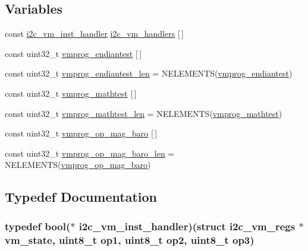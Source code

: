 \subsection*{\-Variables}
\begin{DoxyCompactItemize}
\item 
const \hyperlink{group___generic_i2_c_sensor_gadf40759a617bda9fd99790f2c1f2699a}{i2c\-\_\-vm\-\_\-inst\-\_\-handler} \hyperlink{group___generic_i2_c_sensor_gab83cd2149bbe6ea9179b75ee8a02071e}{i2c\-\_\-vm\-\_\-handlers} \mbox{[}$\,$\mbox{]}
\item 
const uint32\-\_\-t \hyperlink{group___generic_i2_c_sensor_ga97db8eb6770f15d92457ae44bf607d31}{vmprog\-\_\-endiantest} \mbox{[}$\,$\mbox{]}
\item 
const uint32\-\_\-t \hyperlink{group___generic_i2_c_sensor_ga3158e6c7b2a8dff094103560829aba35}{vmprog\-\_\-endiantest\-\_\-len} = \-N\-E\-L\-E\-M\-E\-N\-T\-S(\hyperlink{group___generic_i2_c_sensor_ga97db8eb6770f15d92457ae44bf607d31}{vmprog\-\_\-endiantest})
\item 
const uint32\-\_\-t \hyperlink{group___generic_i2_c_sensor_ga4521deb4c490a6b3d44fc340ad4161cd}{vmprog\-\_\-mathtest} \mbox{[}$\,$\mbox{]}
\item 
const uint32\-\_\-t \hyperlink{group___generic_i2_c_sensor_gad7ec24bf861eca543cf96c11f9607fcc}{vmprog\-\_\-mathtest\-\_\-len} = \-N\-E\-L\-E\-M\-E\-N\-T\-S(\hyperlink{group___generic_i2_c_sensor_ga4521deb4c490a6b3d44fc340ad4161cd}{vmprog\-\_\-mathtest})
\item 
const uint32\-\_\-t \hyperlink{group___generic_i2_c_sensor_ga7f8283bd8d2bd7a50c0de34bc17e6e59}{vmprog\-\_\-op\-\_\-mag\-\_\-baro} \mbox{[}$\,$\mbox{]}
\item 
const uint32\-\_\-t \hyperlink{group___generic_i2_c_sensor_gab041ee4d6bd39413440978233bbb8934}{vmprog\-\_\-op\-\_\-mag\-\_\-baro\-\_\-len} = \-N\-E\-L\-E\-M\-E\-N\-T\-S(\hyperlink{group___generic_i2_c_sensor_ga7f8283bd8d2bd7a50c0de34bc17e6e59}{vmprog\-\_\-op\-\_\-mag\-\_\-baro})
\end{DoxyCompactItemize}


\subsection{\-Typedef \-Documentation}
\hypertarget{group___generic_i2_c_sensor_gadf40759a617bda9fd99790f2c1f2699a}{
\subsubsection[{i2c\-\_\-vm\-\_\-inst\-\_\-handler}]{\setlength{\rightskip}{0pt plus 5cm}typedef bool($\ast$ {\bf i2c\-\_\-vm\-\_\-inst\-\_\-handler})(struct {\bf i2c\-\_\-vm\-\_\-regs} $\ast$vm\-\_\-state, uint8\-\_\-t op1, uint8\-\_\-t op2, uint8\-\_\-t op3)}}\label{group___generic_i2_c_sensor_gadf40759a617bda9fd99790f2c1f2699a}


